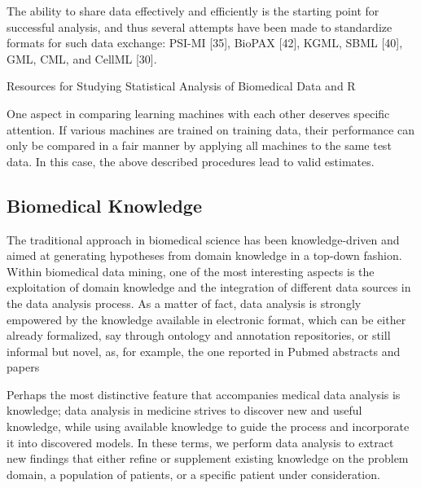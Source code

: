 \documentclass[10pt,a4paper]{article}
\begin{document}
	
	
	
	The ability to share data effectively and efficiently is the starting point for successful
	analysis, and thus several attempts have been made to standardize formats for such
	data exchange: PSI-MI [35], BioPAX [42], KGML, SBML [40], GML, CML, and
	CellML [30]. \cite{Otasek2014}
	
	Resources for Studying Statistical Analysis
	of Biomedical Data and R \cite{Kobayashi2014}
	
	One aspect in comparing learning machines
	with each other deserves specific attention.
	If various machines are trained on
	training data, their performance can only
	be compared in a fair manner by applying
	all machines to the same test data. In this
	case, the above described procedures lead
	to valid estimates. \cite{bellazzi2011data}
	
	\subsection{Biomedical Knowledge}
	
	The traditional approach in biomedical science has been knowledge-driven and aimed at generating hypotheses from domain knowledge in a top-down fashion. Within biomedical data mining, one of the most
	interesting aspects is the exploitation of domain knowledge and the integration of different data sources in the data analysis process. As a matter of fact, data analysis is strongly empowered by the knowledge available in electronic format, which can be either already formalized, say through ontology and annotation repositories, or still informal but novel, as, for example, the one reported in Pubmed abstracts and papers\cite{bellazzi2011data}
	
	Perhaps the most distinctive feature that accompanies medical data analysis is knowledge; data analysis in medicine strives to discover new and useful knowledge, while using available knowledge to guide the process and incorporate it into discovered models. In these terms, we perform data analysis to extract new findings that either refine or supplement existing knowledge on the problem domain, a population of patients, or a specific patient under consideration. \cite{zupan2006knowledge}
	
\end{document}
